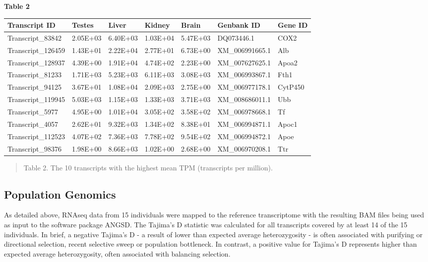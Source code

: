\documentclass[12pt]{article}
\begin{document}
\textbf{\hypertarget{Table 2}{Table 2}} \\
\begin{center}
\begin{adjustwidth}{-.05in}{-.05in}%
\begin{tabular}{ l l l l l l l}
\textbf{Transcript ID}	&	\textbf{Testes}	&	\textbf{Liver}	&	\textbf{Kidney}	&	\textbf{Brain}	&	\textbf{Genbank ID}	&	\textbf{Gene ID}	\\
\hline
Transcript\_83842	&	2.05E+03	&	6.40E+03	&	1.03E+04	&	5.47E+03	&	DQ073446.1	&	COX2	\\
Transcript\_126459	&	1.43E+01	&	2.22E+04	&	2.77E+01	&	6.73E+00	&	XM\_006991665.1	&	Alb	\\
Transcript\_128937	&	4.39E+00	&	1.91E+04	&	4.74E+02	&	2.23E+00	&	XM\_007627625.1	&	Apoa2	\\
Transcript\_81233	&	1.71E+03	&	5.23E+03	&	6.11E+03	&	3.08E+03	&	XM\_006993867.1	&	Fth1	\\
Transcript\_94125	&	3.67E+01	&	1.08E+04	&	2.09E+03	&	2.75E+00	&	XM\_006977178.1	&	CytP450	\\
Transcript\_119945	&	5.03E+03	&	1.15E+03	&	1.33E+03	&	3.71E+03	&	XM\_008686011.1	&	Ubb	\\
Transcript\_5977	&	4.95E+00	&	1.01E+04	&	3.05E+02	&	3.58E+02	&	XM\_006978668.1	&	Tf	\\
Transcript\_4057	&	2.62E+01	&	9.32E+03	&	1.34E+02	&	8.38E+01	&	XM\_006994871.1	&	Apoc1	\\
Transcript\_112523	&	4.07E+02	&	7.36E+03	&	7.78E+02	&	9.54E+02	&	XM\_006994872.1	&	Apoe	\\
Transcript\_98376	&	1.98E+00	&	8.66E+03	&	1.02E+00	&	2.68E+00	&	XM\_006970208.1	&	Ttr	\\
\end{tabular}
\end{adjustwidth}
\end{center}
\begin{quote}
\small{Table 2. The 10 transcripts with the highest mean TPM (transcripts per million).}
\end{quote}  



\subsection*{Population Genomics}

As detailed above, RNAseq data from 15 individuals were mapped to the reference transcriptome with the resulting BAM files being used as input to the software package ANGSD. The Tajima's D statistic was calculated for all  transcripts covered by at least 14 of the 15 individuals. In brief, a negative Tajima's D - a result of lower than expected average heterozygosity - is often associated with purifying or directional selection, recent selective sweep or population bottleneck. In contrast, a positive value for Tajima's D represents higher than expected average heterozygosity, often associated with balancing selection. \\ 
\end{document}
